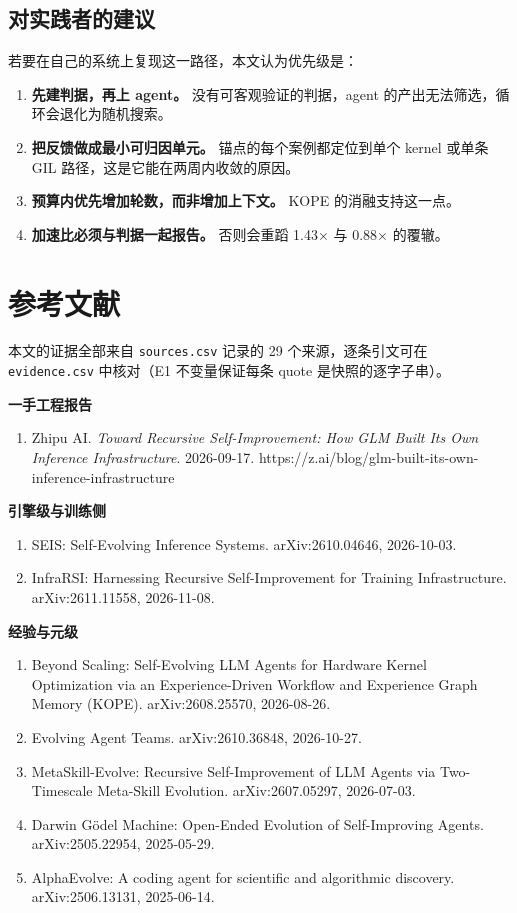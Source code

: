 \subsection{对实践者的建议}

若要在自己的系统上复现这一路径，本文认为优先级是：


\begin{enumerate}
  \item \textbf{先建判据，再上 agent。} 没有可客观验证的判据，agent 的产出无法筛选，循环会退化为随机搜索。
  \item \textbf{把反馈做成最小可归因单元。} 锚点的每个案例都定位到单个 kernel 或单条 GIL 路径，这是它能在两周内收敛的原因。
  \item \textbf{预算内优先增加轮数，而非增加上下文。} KOPE 的消融支持这一点。
  \item \textbf{加速比必须与判据一起报告。} 否则会重蹈 1.43× 与 0.88× 的覆辙。
\end{enumerate}


\section{参考文献}

本文的证据全部来自 \texttt{sources.csv} 记录的 29 个来源，逐条引文可在 \texttt{evidence.csv} 中核对（E1 不变量保证每条 quote 是快照的逐字子串）。


\textbf{一手工程报告}


\begin{enumerate}
  \item Zhipu AI. \textit{Toward Recursive Self-Improvement: How GLM Built Its Own Inference Infrastructure}. 2026-09-17. https://z.ai/blog/glm-built-its-own-inference-infrastructure
\end{enumerate}

\textbf{引擎级与训练侧}


\begin{enumerate}
  \item SEIS: Self-Evolving Inference Systems. arXiv:2610.04646, 2026-10-03.
  \item InfraRSI: Harnessing Recursive Self-Improvement for Training Infrastructure. arXiv:2611.11558, 2026-11-08.
\end{enumerate}

\textbf{经验与元级}


\begin{enumerate}
  \item Beyond Scaling: Self-Evolving LLM Agents for Hardware Kernel Optimization via an Experience-Driven Workflow and Experience Graph Memory (KOPE). arXiv:2608.25570, 2026-08-26.
  \item Evolving Agent Teams. arXiv:2610.36848, 2026-10-27.
  \item MetaSkill-Evolve: Recursive Self-Improvement of LLM Agents via Two-Timescale Meta-Skill Evolution. arXiv:2607.05297, 2026-07-03.
  \item Darwin Gödel Machine: Open-Ended Evolution of Self-Improving Agents. arXiv:2505.22954, 2025-05-29.
  \item AlphaEvolve: A coding agent for scientific and algorithmic discovery. arXiv:2506.13131, 2025-06-14.
\end{enumerate}


